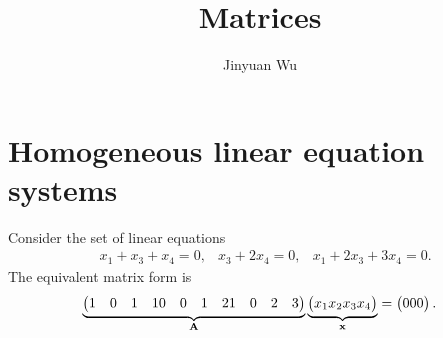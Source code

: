 \documentclass[hyperref, a4paper]{article}
\title{Matrices}
\author{Jinyuan Wu}
\def\\{}%
\newcommand*{\mat}[1]{\vb{#1}}
\begin{document}
\maketitle

\section{Homogeneous linear equation systems}

Consider the set of linear equations 
\begin{equation}
    \begin{aligned}
        &x_1 + x_3 + x_4 = 0, \\
        &x_3 + 2 x_4 = 0, \\
        &x_1 + 2 x_3 + 3 x_4 = 0.
    \end{aligned}
\end{equation}
The equivalent matrix form is 
\begin{equation}
    \underbrace{\pmqty{
        1 & 0 & 1 & 1 \\
        0 & 0 & 1 & 2 \\
        1 & 0 & 2 & 3
    }}_{\mat{A}} \underbrace{\pmqty{x_1 \\ x_2 \\ x_3 \\ x_4}}_{\vb{x}} = \pmqty{0 \\ 0 \\ 0}.
\end{equation}
\end{document}
